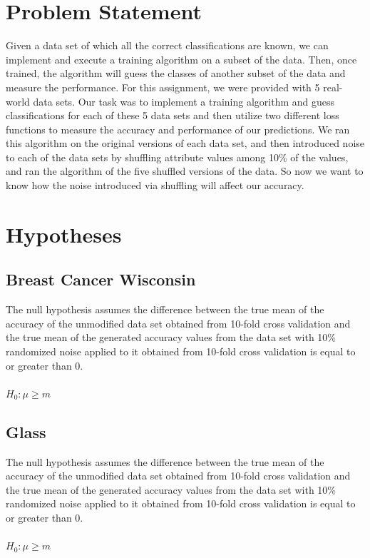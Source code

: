 \documentclass[twoside,11pt]{article}
\begin{document}
\section{Problem Statement}
Given a data set of which all the correct classifications are known, we can implement and execute a training algorithm on a subset of the data. Then, once trained, the algorithm will guess the classes of another subset of the data and measure the performance. For this assignment, we were provided with 5 real-world data sets. Our task was to implement a training algorithm and guess classifications for each of these 5 data sets and then utilize two different loss functions to measure the accuracy and performance of our predictions. We ran this algorithm on the original versions of each data set, and then introduced noise to each of the data sets by shuffling attribute values among 10\% of the values, and ran the algorithm of the five shuffled versions of the data. So now we want to know how the noise introduced via shuffling will affect our accuracy. \\
\section{Hypotheses}

\subsection{Breast Cancer Wisconsin} The null hypothesis assumes the difference between the true mean of the accuracy of the unmodified data set obtained from 10-fold cross validation and the true mean of the generated accuracy values from the data set with 10\% randomized noise applied to it obtained from 10-fold cross validation is equal to or greater than 0.\\\\
$H_0 : \mu \geq m$

\subsection{Glass} The null hypothesis assumes the difference between the true mean of the accuracy of the unmodified data set obtained from 10-fold cross validation and the true mean of the generated accuracy values from the data set with 10\% randomized noise applied to it obtained from 10-fold cross validation is equal to or greater than 0.\\\\
$H_0 : \mu \geq m$
\end{document}
